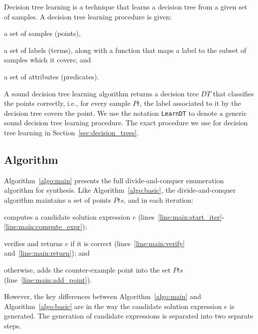 \documentclass{llncs}
\newcommand\Points{\mathit{Pts}}
\newcommand\Point{\mathit{Pt}}
\newcommand\Expr{e}
\newcommand\DecisionTree{\mathit{DT}}
\begin{document}
Decision tree learning is a technique that learns a decision tree from a
given set of samples.
A decision tree learning procedure is given:
\begin{inparaenum}[(a)]
\item a set of samples (points),
\item a set of labels (terms), along with a function that maps a label to the
  subset of samples which it covers; and
\item a set of attributes (predicates).
\end{inparaenum}
A sound decision tree learning algorithm returns a decision tree
$\DecisionTree$ that classifies the points correctly, i.e., for every
sample $\Point$, the label associated to it by the decision tree covers
the point.
We use the notation {\tt LearnDT} to denote a generic sound
decision tree learning procedure.
The exact procedure we use for decision tree learning in
Section~\ref{sec:decision_trees}.

\subsection{Algorithm}
\label{sec:algo:main}

Algorithm~\ref{algo:main} presents the full divide-and-conquer
enumeration algorithm for synthesis.
Like Algorithm~\ref{algo:basic}, the divide-and-conquer algorithm
maintains a set of points $\Points$, and in each iteration:
\begin{inparaenum}[(a)]
\item computes a candidate solution expression $\Expr$
  (lines~\ref{line:main:start_iter}-\ref{line:main:compute_expr});
\item verifies and returns $\Expr$ if it is correct (lines~\ref{line:main:verify}
  and~\ref{line:main:return}); and
\item otherwise, adds the counter-example point into the set $\Points$
  (line~\ref{line:main:add_point}).
\end{inparaenum}

However, the key differences between Algorithm~\ref{algo:main} and
Algorithm~\ref{algo:basic} are in the way the candidate solution
expression $\Expr$ is generated.
The generation of candidate expressions is separated into two separate
steps.
\end{document}

